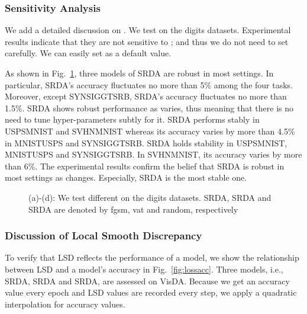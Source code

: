 \documentclass[journal,twocolumn]{IEEEtran}
\theoremstyle{definition}
\begin{document}
\subsubsection{Sensitivity Analysis}

We add a detailed discussion on . We test  on the digits datasets. Experimental results indicate that they are not sensitive to ; and thus we do not need to set  carefully. We can easily set  as a default value. 

As shown in Fig.~\ref{fig:sensitivity}, three models of SRDA are robust in most settings. In particular, SRDA's accuracy fluctuates no more than 5\% among the four tasks. Moreover, except SYNSIGGTSRB, SRDA's accuracy fluctuates no more than 1.5\%. SRDA shows robust performance as  varies, thus meaning that there is no need to tune hyper-parameters subtly for it. SRDA performs stably in USPSMNIST and SVHNMNIST whereas its accuracy varies by more than 4.5\% in MNISTUSPS and SYNSIGGTSRB. SRDA holds stability in USPSMNIST, MNISTUSPS and SYNSIGGTSRB. In SVHNMNIST, its accuracy varies by more than 6\%. The experimental results confirm the belief that SRDA is robust in most settings as  changes. Especially, SRDA is the most stable one. 

\begin{figure}
  \centering
\caption{(a)-(d): We test different  on the digits datasets. SRDA, SRDA and SRDA are denoted by fgsm, vat and random, respectively}
  \label{fig:sensitivity} \end{figure}

\subsubsection{Discussion of Local Smooth Discrepancy}

To verify that LSD reflects the performance of a model, we show the relationship between LSD and a model's accuracy in Fig.~\ref{fig:lossacc}. Three models, i.e., SRDA, SRDA and SRDA, are assessed on VisDA. Because we get an accuracy value every epoch and LSD values are recorded every step,
we apply a quadratic interpolation for accuracy values.
\end{document}
